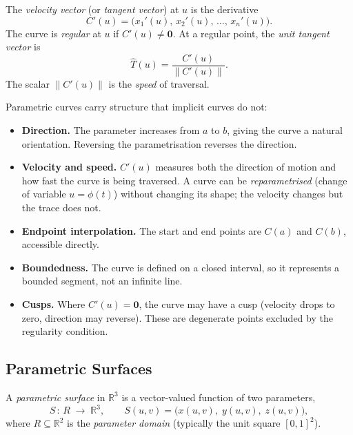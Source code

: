 \begin{tcolorbox}[colback=propbox, colframe=propborder, arc=2pt,
  left=6pt, right=6pt, top=4pt, bottom=4pt,
  title={\small\textbf{Definition (Velocity, Regularity, Unit Tangent)}},
  fonttitle=\small\bfseries]
The \emph{velocity vector} (or \emph{tangent vector}) at $u$ is the derivative
\[
  C'(u) = \bigl(x_1'(u),\,x_2'(u),\,\ldots,\,x_n'(u)\bigr).
\]
The curve is \emph{regular} at $u$ if $C'(u) \neq \mathbf{0}$.
At a regular point, the \emph{unit tangent vector} is
\[
  \hat{T}(u) = \frac{C'(u)}{\|C'(u)\|}.
\]
The scalar $\|C'(u)\|$ is the \emph{speed} of traversal.
\end{tcolorbox}

\begin{remark*}
Parametric curves carry structure that implicit curves do not:
\begin{itemize}
  \item \textbf{Direction.}
        The parameter increases from $a$ to $b$, giving the curve
        a natural orientation.
        Reversing the parametrisation reverses the direction.
  \item \textbf{Velocity and speed.}
        $C'(u)$ measures both the direction of motion and how fast
        the curve is being traversed.
        A curve can be \emph{reparametrised} (change of variable
        $u = \phi(t)$) without changing its shape;
        the velocity changes but the trace does not.
  \item \textbf{Endpoint interpolation.}
        The start and end points are $C(a)$ and $C(b)$, accessible directly.
  \item \textbf{Boundedness.}
        The curve is defined on a closed interval, so it represents
        a bounded segment, not an infinite line.
  \item \textbf{Cusps.}
        Where $C'(u) = \mathbf{0}$, the curve may have a cusp
        (velocity drops to zero, direction may reverse).
        These are degenerate points excluded by the regularity condition.
\end{itemize}
\end{remark*}

\subsection{Parametric Surfaces}

\begin{tcolorbox}[colback=propbox, colframe=propborder, arc=2pt,
  left=6pt, right=6pt, top=4pt, bottom=4pt,
  title={\small\textbf{Definition (Parametric Surface)}},
  fonttitle=\small\bfseries]
A \emph{parametric surface} in $\mathbb{R}^3$ is a vector-valued function
of two parameters,
\[
  S\,:\,R\;\longrightarrow\;\mathbb{R}^3, \qquad
  S(u,v) = \bigl(x(u,v),\;y(u,v),\;z(u,v)\bigr),
\]
where $R\subseteq\mathbb{R}^2$ is the \emph{parameter domain}
(typically the unit square $[0,1]^2$).
\end{tcolorbox}

